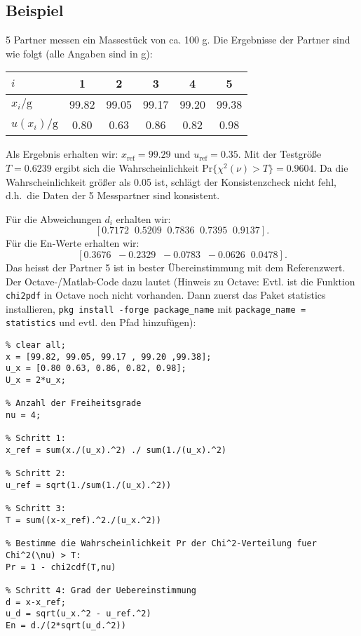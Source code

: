 \subsection{Beispiel}
\label{Beispielringvergleich1}
5 Partner messen ein Massestück von ca. 100 g. Die Ergebnisse
der Partner sind wie folgt (alle Angaben sind in g):
\begin{center}
\begin{tabular}{l | c c c c c}
$i$	& 1 & 2 & 3 & 4 & 5 \\	\hline
$x_i / \mathrm{g}$ & 99.82 &  99.05 & 99.17 & 99.20 & 99.38  \\ \hline
$u(x_i) / \mathrm{g}$ & 0.80 & 0.63 & 0.86 & 0.82 & 0.98
\end{tabular}
\end{center}
Als Ergebnis erhalten wir: $x_\mathrm{ref} = 99.29$ und $u_\mathrm{ref} = 0.35$.
Mit der Testgröße $T=0.6239$ ergibt sich die Wahrscheinlichkeit
$\mathrm{Pr}\{\chi^2(\nu) > T\} = 0.9604$. Da die Wahrscheinlichkeit größer als 0.05 ist, schlägt der
Konsistenzcheck nicht fehl,
d.h.\ die Daten der 5 Messpartner sind konsistent.

Für die Abweichungen $d_i$ erhalten wir:
$$
[0.7172 \;\;   0.5209 \;\;   0.7836  \;\;  0.7395 \;\;   0.9137].
$$
Für die En-Werte erhalten wir:
$$
[ 0.3676 \;\;  -0.2329 \;\;  -0.0783 \;\;  -0.0626 \;\;   0.0478].
$$
Das heisst der Partner 5 ist in bester Übereinstimmung mit dem Referenzwert. \\
Der Octave-/Matlab-Code dazu lautet (Hinweis zu Octave: Evtl. ist die Funktion
\texttt{chi2pdf} in Octave noch nicht vorhanden. Dann zuerst das Paket statistics
installieren, \texttt{pkg install -forge package\_name} mit
\texttt{package\_name = statistics} und evtl. den Pfad hinzufügen): \\
\begin{lstlisting}[style=Matlab]
% addpath('C:\Octave\Octave-4.2.1\share\octave\packages');
% clear all;
x = [99.82, 99.05, 99.17 , 99.20 ,99.38];
u_x = [0.80 0.63, 0.86, 0.82, 0.98];
U_x = 2*u_x;

% Anzahl der Freiheitsgrade
nu = 4;

% Schritt 1:
x_ref = sum(x./(u_x).^2) ./ sum(1./(u_x).^2)

% Schritt 2:
u_ref = sqrt(1./sum(1./(u_x).^2))

% Schritt 3:
T = sum((x-x_ref).^2./(u_x.^2))

% Bestimme die Wahrscheinlichkeit Pr der Chi^2-Verteilung fuer Chi^2(\nu) > T:
Pr = 1 - chi2cdf(T,nu)

% Schritt 4: Grad der Uebereinstimmung
d = x-x_ref;
u_d = sqrt(u_x.^2 - u_ref.^2)
En = d./(2*sqrt(u_d.^2))
\end{lstlisting}

